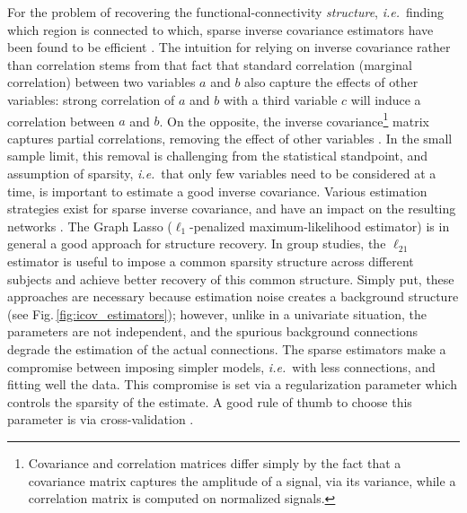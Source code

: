 \documentclass[5p]{elsarticle}
\begin{document}
For the problem of recovering the functional-connectivity
\emph{structure}, \emph{i.e.}\ finding which region is connected to
which, sparse inverse covariance estimators have been found to be
efficient \cite{varoquaux2010c, smith2011}. The intuition for relying on
inverse covariance rather than correlation stems from that fact that
standard correlation (marginal correlation) between two variables $a$ and
$b$ also capture the effects of other variables: strong correlation of
$a$ and $b$ with a third variable $c$ will induce a correlation between
$a$ and $b$. On the opposite, the inverse covariance\footnote{Covariance
and correlation matrices differ simply by the fact that a covariance
matrix captures the amplitude of a signal, via its variance, while a
correlation matrix is computed on normalized signals.}
matrix captures
partial correlations, removing the effect of other variables
\cite{marrelec2006a}. In the small sample limit, this removal is
challenging from the statistical standpoint, and assumption of sparsity,
\emph{i.e.}\ that only few variables need to be considered at a time, is
important to estimate a good inverse covariance. Various estimation
strategies exist for sparse inverse covariance, and have an impact on the
resulting networks \cite{varoquaux2012,varoquaux2010c}. The
Graph Lasso ($\ell_1$-penalized maximum-likelihood estimator)
\cite{friedman2008} is in general a good approach for structure recovery. In group studies,
the $\ell_{21}$ estimator \cite{varoquaux2010c,honorio2012} is useful to
impose a common sparsity structure across different subjects and achieve
better recovery of this common structure. Simply put, these approaches
are necessary because estimation noise creates a background structure
(see Fig.\,\ref{fig:icov_estimators}); however, unlike in a univariate situation, the
parameters are not independent, and the spurious background connections
degrade the estimation of the actual connections. The sparse estimators
make a compromise between imposing simpler models, \emph{i.e.}\ with less
connections, and fitting well the data. This compromise is set via a
regularization parameter which controls the sparsity of the estimate. A
good rule of thumb to choose this parameter is via cross-validation
\cite{varoquaux2010c}.

\end{document}
